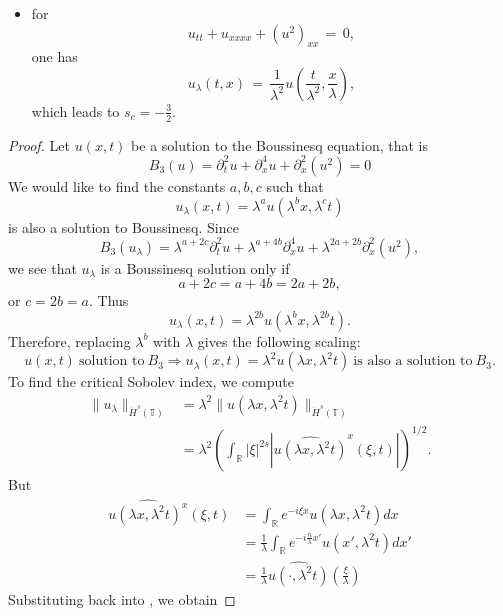 \documentclass[12pt,reqno]{amsart}
\numberwithin{equation}{section}  %
\renewcommand{\cref}{\Cref}
\newcommand{\rr}{\mathbb{R}}
\newcommand{\ci}{\mathbb{T}}
\newcommand{\wh}{\widehat}
\begin{document}
\begin{itemize}
  \item for 
    \[
    u_{tt}+u_{xxxx}+(u^2)_{xx}\,=\,0,
    \]
    one has 
    \[
    u_{\lambda}(t,x)\,=\,\frac{1}{\lambda^2}u\left(\frac{t}{\lambda^2}, \frac{x}{\lambda}\right),
    \]
    which leads to $s_c=-\frac 32$.
\end{itemize}
\begin{proof}
Let $u(x, t)$ be a solution to the Boussinesq equation, that is
%
$$
B_3(u)=
 \partial_t^2u + \partial^4_x u + \partial_x^2(u^2)  = 0
$$
%
We would like to find the constants
$a, b, c$ such that
\[
u_\lambda (x, t) = \lambda^a u(\lambda^b x, \lambda^c t)
\]
is also a solution to Boussinesq.  Since 
$$
B_3(u_\lambda)=
\lambda^{a+2c} \partial_t^2u 
+
 \lambda^{a+4b} \partial^4_x u 
 +
  \lambda^{2a+2b}
  \partial_x^2(u^2),  
$$
we see that $u_\lambda$ is a Boussinesq solution only if
$$
a+2c=a+4b=2a+2b,
$$
or
$
c= 2b =a.
$
  Thus
\[
u_\lambda (x, t) = \lambda^{2b} u(\lambda^{b}x,  \lambda^{2b} t).
\]
%
%
Therefore, replacing  $\lambda^b$ with  $ \lambda$ gives the following scaling:
%
\begin{equation}
\label{DP-scal}
\boxed{u(x, t) \ \text{solution to} \  B_3
 \Longrightarrow 
u_\lambda (x, t) = \lambda^2 u(\lambda x, \lambda^2 t)  \ \text{is also a
solution to} \  B_3.}
\end{equation}
\label{rem:scaling}
To find the critical Sobolev index, we compute
%
%
\begin{equation}
\begin{split}
  \| u_{\lambda} \|_{\dot{H}^s(\ci)} 
  & = \lambda^{2} \| u(\lambda x, \lambda^2 t) \|_{\dot{H}^{s}(\ci)}
  \\
  & = \lambda^{2} \left( \int_{\rr} | \xi |^{2s} | \wh{u (\lambda x,
  \lambda^{2} t)}^x (\xi, t)| \right)^{1/2}.
\end{split}
\label{crit-ind-comp}
\end{equation}
%
But
%
%
\begin{equation*}
\begin{split}
  \wh{u(\lambda x, \lambda^{2}t)^x}(\xi, t)
  & = \int_{\rr}e^{-i\xi x}u(\lambda x, \lambda^2 t) dx
  \\
  & = \frac{1}{\lambda} \int_{\rr}e^{-i \frac{n}{\lambda} x'}u(x',
  \lambda^{2} t) dx'
  \\
  & = \frac{1}{\lambda} \wh{u(\cdot, \lambda^{2}t)}(\frac{\xi}{\lambda})
\end{split}
\end{equation*}
%
%
Substituting back into \cref{crit-ind-comp}, we obtain

\end{proof}
\end{document}
